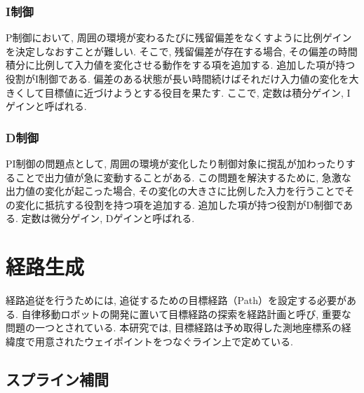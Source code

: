 \subsubsection{I制御}
P制御において, 周囲の環境が変わるたびに残留偏差をなくすように比例ゲインを決定しなおすことが難しい.
そこで, 残留偏差が存在する場合, その偏差の時間積分に比例して入力値を変化させる動作をする項を追加する.
追加した項が持つ役割がI制御である.
偏差のある状態が長い時間続けばそれだけ入力値の変化を大きくして目標値に近づけようとする役目を果たす.
ここで, 定数は積分ゲイン, Iゲインと呼ばれる.

\subsubsection{D制御}
PI制御の問題点として, 周囲の環境が変化したり制御対象に撹乱が加わったりすることで出力値が急に変動することがある.
この問題を解決するために, 急激な出力値の変化が起こった場合, その変化の大きさに比例した入力を行うことでその変化に抵抗する役割を持つ項を追加する.
追加した項が持つ役割がD制御である.
定数は微分ゲイン, Dゲインと呼ばれる.

\section{経路生成}
経路追従を行うためには, 追従するための目標経路（Path）を設定する必要がある.
自律移動ロボットの開発に置いて目標経路の探索を経路計画と呼び, 重要な問題の一つとされている.
本研究では, 目標経路は予め取得した測地座標系の経緯度で用意されたウェイポイントをつなぐライン上で定めている.


\subsection{スプライン補間}



\newpage